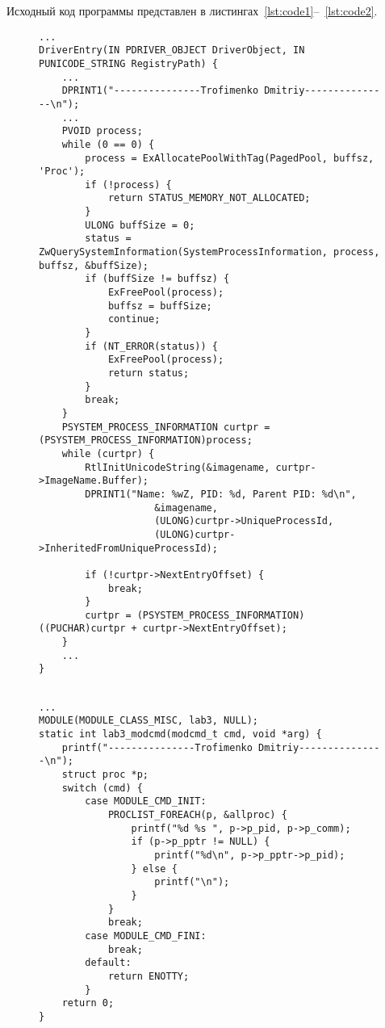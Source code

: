 \documentclass[a4paper, 14pt]{extarticle}
\begin{document}
Исходный код программы представлен в листингах~\ref{lst:code1}--~\ref{lst:code2}.
\begin{figure}[!htb]
\begin{lstlisting}[language={},caption={
lab3driver.c (ReactOS).},label={lst:code1}]
...
DriverEntry(IN PDRIVER_OBJECT DriverObject, IN PUNICODE_STRING RegistryPath) {
    ...
    DPRINT1("---------------Trofimenko Dmitriy---------------\n");
    ...
    PVOID process;
    while (0 == 0) {
        process = ExAllocatePoolWithTag(PagedPool, buffsz, 'Proc');
        if (!process) {
            return STATUS_MEMORY_NOT_ALLOCATED;
        }
        ULONG buffSize = 0;
        status = ZwQuerySystemInformation(SystemProcessInformation, process, buffsz, &buffSize);
        if (buffSize != buffsz) {
            ExFreePool(process);
            buffsz = buffSize;
            continue;
        }
        if (NT_ERROR(status)) {
            ExFreePool(process);
            return status;
        }
        break;
    }
    PSYSTEM_PROCESS_INFORMATION curtpr = (PSYSTEM_PROCESS_INFORMATION)process;
    while (curtpr) {
        RtlInitUnicodeString(&imagename, curtpr->ImageName.Buffer);
        DPRINT1("Name: %wZ, PID: %d, Parent PID: %d\n", 
                    &imagename, 
                    (ULONG)curtpr->UniqueProcessId,
                    (ULONG)curtpr->InheritedFromUniqueProcessId);

        if (!curtpr->NextEntryOffset) {
            break;
        }
        curtpr = (PSYSTEM_PROCESS_INFORMATION)((PUCHAR)curtpr + curtpr->NextEntryOffset);
    }
    ... 
}


\end{lstlisting}
\end{figure}

\begin{figure}[!htb]
\begin{lstlisting}[language={},caption={
lab3.c (NetBSD).},label={lst:code2}]
...
MODULE(MODULE_CLASS_MISC, lab3, NULL);
static int lab3_modcmd(modcmd_t cmd, void *arg) {
    printf("---------------Trofimenko Dmitriy---------------\n");
    struct proc *p;
    switch (cmd) {
        case MODULE_CMD_INIT:
            PROCLIST_FOREACH(p, &allproc) {
                printf("%d %s ", p->p_pid, p->p_comm);
                if (p->p_pptr != NULL) {
                    printf("%d\n", p->p_pptr->p_pid);
                } else {
                    printf("\n");
                }
            }
            break;
        case MODULE_CMD_FINI:
            break;
        default:
            return ENOTTY;
        }
    return 0;
}


\end{lstlisting}
\end{figure}
\end{document}
